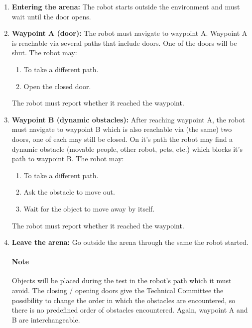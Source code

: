 \begin{enumerate}
\item \textbf{Entering the arena:} The robot starts outside the environment and must wait until the door opens.
\item \textbf{Waypoint A (door):} The robot must navigate to waypoint A. Waypoint A is reachable via several paths that include doors. One of the doors will be shut. The robot may:
\begin{enumerate}
\item To take a different path.
\item Open the closed door.
\end{enumerate}
The robot must report whether it reached the waypoint.

\item \textbf{Waypoint B (dynamic obstacles):} After reaching waypoint A, the robot must navigate to waypoint B which is also reachable via (the same) two doors, one of each may still be closed. On it's path the robot may find a dynamic obstacle (movable people, other robot, pets, etc.) which blocks it's path to waypoint B. The robot may:
\begin{enumerate}
\item To take a different path.
\item Ask the obstacle to move out.
\item Wait for the object to move away by itself.
\end{enumerate}
The robot must report whether it reached the waypoint.
\item \textbf{Leave the arena:} Go outside the arena through the same the robot started.

\paragraph{Note} Objects will be placed during the test in the robot's path which it must avoid. The closing / opening doors give the Technical Committee the possibility to change the order in which the obstacles are encountered, so there is no predefined order of obstacles encountered. Again, waypoint A and B are interchangeable.
\end{enumerate}

